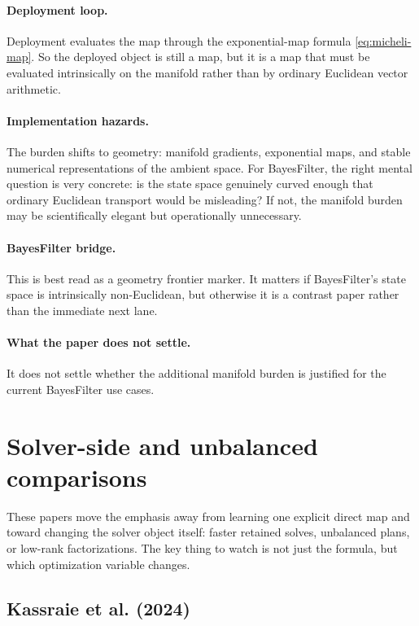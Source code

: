 \documentclass[11pt]{report}
\begin{document}
\paragraph{Deployment loop.}
Deployment evaluates the map through the exponential-map formula
\eqref{eq:micheli-map}.  So the deployed object is still a map, but it is a map that
must be evaluated intrinsically on the manifold rather than by ordinary Euclidean
vector arithmetic.

\paragraph{Implementation hazards.}
The burden shifts to geometry: manifold gradients, exponential maps, and stable
numerical representations of the ambient space.  For BayesFilter, the right mental
question is very concrete: is the state space genuinely curved enough that ordinary
Euclidean transport would be misleading?  If not, the manifold burden may be
scientifically elegant but operationally unnecessary.

\paragraph{BayesFilter bridge.}
This is best read as a geometry frontier marker.  It matters if BayesFilter's state
space is intrinsically non-Euclidean, but otherwise it is a contrast paper rather
than the immediate next lane.

\paragraph{What the paper does not settle.}
It does not settle whether the additional manifold burden is justified for the
current BayesFilter use cases.
\section{Solver-side and unbalanced comparisons}

These papers move the emphasis away from learning one explicit direct map and
toward changing the solver object itself: faster retained solves, unbalanced plans,
or low-rank factorizations.  The key thing to watch is not just the formula, but
which optimization variable changes.

\subsection*{Kassraie et al. (2024)}
\end{document}

